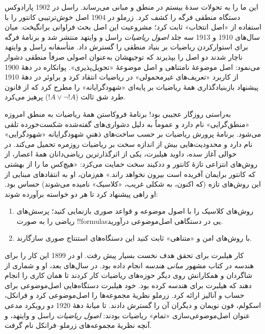 \documentclass[../../../include/open-logic-section]{subfiles}
\begin{document}
این ما را به تحولات سدهٔ بیستم در منطق و مبانی می‌رساند. راسل در
1902 پارادوکس دستگاه منطقی فرگه را کشف کرد. زرملو در 1904 اصل
خوش‌ترتیبی کانتور را با استفاده از «اصل انتخاب» ثابت کرد؛ مشروعیت
این اصل بحث فراوانی برانگیخت. میان سال‌های 1910 و 1913 سه جلد
\emph{اصول ریاضیات} راسل و وایتهد منتشر شد و برنامهٔ فرگه برای
استوارکردن ریاضیات بر بنیاد منطقی را گسترش داد. متأسفانه راسل و
وایتهد ناچار شدند دو اصل را بپذیرند که توجیهشان به‌عنوان اصولی صرفاً
منطقی دشوار می‌نمود: اصل موضوعهٔ نامتناهی و اصل موضوعهٔ «تحویل‌پذیری».
پوانکاره در دههٔ 1900 از کاربرد «تعریف‌های غیرمحمولی» در ریاضیات
انتقاد کرد و براوئر در دههٔ 1910 پیشنهاد بازبنیادگذاری همهٔ ریاضیات
بر پایه‌ای «شهودگرایانه» را مطرح کرد که از قانون طرد شق ثالث
($!A\lor\lnot !A$) پرهیز می‌کرد.

به‌راستی روزگار عجیبی بود!{} برنامهٔ فروکاستن همهٔ ریاضیات به منطق
امروزه «منطق‌گرایی» نام دارد و عموماً به دلیل دشواری‌های گفته‌شده
شکست‌خورده تلقی می‌شود. برنامهٔ پرورش ریاضیات بر حسب ساخت‌های ذهنیِ
شهودگرایانه «شهودگرایی» نام دارد و محدودیت‌هایی بیش از اندازه سخت بر
ریاضیات روزمره تحمیل می‌کند. در حوالی آغاز سده، داوید هیلبرت، یکی از
اثرگذارترین ریاضی‌دانان همهٔ اعصار، از روش‌های انتزاعی تازهٔ کانتور و
ددکیند سخت حمایت می‌کرد: «هیچ‌کس ما را از بهشتی که کانتور برایمان
آفریده است بیرون نخواهد راند.» هم‌زمان، او به انتقادهای مبنایی از
این روش‌های تازه (که اکنون، به شکلی غریب، «کلاسیک» نامیده می‌شوند)
حساس بود. او راهی پیشنهاد کرد تا هر دو خواسته برآورده شوند:
\begin{enumerate}
\item روش‌های کلاسیک را با اصول موضوعه و قواعد صوری بازنمایی کنید؛
  پرسش‌های ریاضی را به صورت !!{formula}sیی در دستگاهی اصل‌موضوعی درآورید.
\item با روش‌های امن و «متناهی» ثابت کنید این دستگاه‌های استنتاج صوری
  سازگارند.
\end{enumerate}

کار هیلبرت برای تحقق هدف نخست بسیار پیش رفت. او در 1899 این کار را
برای هندسه در کتاب مشهور \emph{مبانی هندسه} انجام داده بود. در
سال‌های بعد، او و شماری از شاگردان و همکارانش روی دیگر حوزه‌های
ریاضیات کار کردند تا همان کاری را انجام دهند که هیلبرت برای هندسه
کرده بود. خود هیلبرت دستگاه‌هایی اصل‌موضوعی برای حساب و آنالیز ارائه
کرد. زرملو نظریهٔ مجموعه‌ها را اصل‌موضوعی کرد و فرانکل، اسکولم، فون
نویمان و دیگران آن را گسترش دادند. تا میانهٔ دههٔ 1920 دو رویکرد
مدعی عنوان اصل‌موضوعی‌سازی «تمام» ریاضیات بودند: \emph{اصول ریاضیات}
راسل و وایتهد، و آنچه نظریهٔ مجموعه‌های زرملو--فرانکل نام گرفت.
\end{document}

